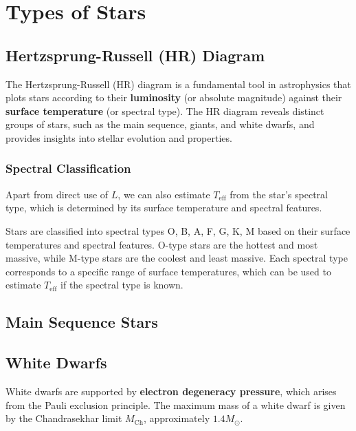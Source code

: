 \chapter{Types of Stars}

\section{Hertzsprung-Russell (HR) Diagram}
\begin{intuition}
The Hertzsprung-Russell (HR) diagram is a fundamental tool in astrophysics that plots stars according to their \textbf{luminosity} (or absolute magnitude) against their \textbf{surface temperature} (or spectral type).
The HR diagram reveals distinct groups of stars, such as the main sequence, giants, and white dwarfs, and provides insights into stellar evolution and properties.
\end{intuition}

\subsection{Spectral Classification}
Apart from direct use of $L$, we can also estimate $T_{\text{eff}}$ from the star's spectral type, which is determined by its surface temperature and spectral features. 
\begin{theory}
Stars are classified into spectral types O, B, A, F, G, K, M based on their surface temperatures and spectral features. O-type stars are the hottest and most massive, while M-type stars are the coolest and least massive.
Each spectral type corresponds to a specific range of surface temperatures, which can be used to estimate $T_{\text{eff}}$ if the spectral type is known.
\end{theory}

\section{Main Sequence Stars}

\section{White Dwarfs}
\begin{theory}
White dwarfs are supported by \textbf{electron degeneracy pressure}, which arises from the Pauli exclusion principle. 
The maximum mass of a white dwarf is given by the Chandrasekhar limit $M_{\text{Ch}}$, approximately $1.4 M_\odot$.
\end{theory}

